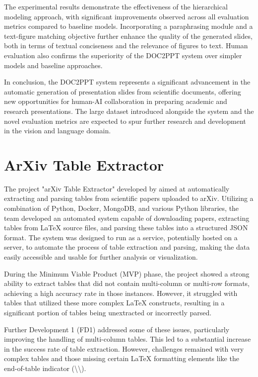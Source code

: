 The experimental results demonstrate the effectiveness of the hierarchical modeling approach, with significant improvements observed across all evaluation metrics compared to baseline models. Incorporating a paraphrasing module and a text-figure matching objective further enhance the quality of the generated slides, both in terms of textual conciseness and the relevance of figures to text. Human evaluation also confirms the superiority of the DOC2PPT system over simpler models and baseline approaches.

In conclusion, the DOC2PPT system represents a significant advancement in the automatic generation of presentation slides from scientific documents, offering new opportunities for human-AI collaboration in preparing academic and research presentations. The large dataset introduced alongside the system and the novel evaluation metrics are expected to spur further research and development in the vision and language domain.

\section{ArXiv Table Extractor}

The project "arXiv Table Extractor" developed by \citet{Ramsay:2021:BachelorThesis} aimed at automatically extracting and parsing tables from scientific papers uploaded to arXiv. Utilizing a combination of Python, Docker, MongoDB, and various Python libraries, the team developed an automated system capable of downloading papers, extracting tables from \LaTeX{} source files, and parsing these tables into a structured JSON format. The system was designed to run as a service, potentially hosted on a server, to automate the process of table extraction and parsing, making the data easily accessible and usable for further analysis or visualization.

During the Minimum Viable Product (MVP) phase, the project showed a strong ability to extract tables that did not contain multi-column or multi-row formats, achieving a high accuracy rate in those instances. However, it struggled with tables that utilized these more complex \LaTeX{} constructs, resulting in a significant portion of tables being unextracted or incorrectly parsed.

Further Development 1 (FD1) addressed some of these issues, particularly improving the handling of multi-column tables. This led to a substantial increase in the success rate of table extraction. However, challenges remained with very complex tables and those missing certain \LaTeX{} formatting elements like the end-of-table indicator (\textbackslash\textbackslash).

